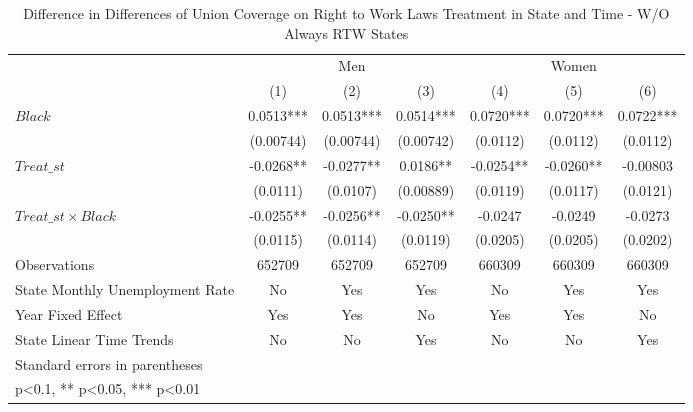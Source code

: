 \begin{table}[htbp]\centering
\def\sym#1{\ifmmode^{#1}\else\(^{#1}\)\fi}
\caption{Difference in Differences of Union Coverage on Right to Work Laws Treatment in State and Time - W/O Always RTW States}
\begin{tabular}{l*{6}{c}}
\hline\hline
                    &\multicolumn{3}{c}{Men}                        &\multicolumn{3}{c}{Women}                      \\\cmidrule(lr){2-4}\cmidrule(lr){5-7}
                    &\multicolumn{1}{c}{(1)}   &\multicolumn{1}{c}{(2)}   &\multicolumn{1}{c}{(3)}   &\multicolumn{1}{c}{(4)}   &\multicolumn{1}{c}{(5)}   &\multicolumn{1}{c}{(6)}   \\
\hline
$ Black $           &      0.0513***&      0.0513***&      0.0514***&      0.0720***&      0.0720***&      0.0722***\\
                    &   (0.00744)   &   (0.00744)   &   (0.00742)   &    (0.0112)   &    (0.0112)   &    (0.0112)   \\
[1em]
$ Treat\_{st} $      &     -0.0268** &     -0.0277** &      0.0186** &     -0.0254** &     -0.0260** &    -0.00803   \\
                    &    (0.0111)   &    (0.0107)   &   (0.00889)   &    (0.0119)   &    (0.0117)   &    (0.0121)   \\
[1em]
$ Treat\_{st} \times Black $&     -0.0255** &     -0.0256** &     -0.0250** &     -0.0247   &     -0.0249   &     -0.0273   \\
                    &    (0.0115)   &    (0.0114)   &    (0.0119)   &    (0.0205)   &    (0.0205)   &    (0.0202)   \\
\hline
Observations        &      652709   &      652709   &      652709   &      660309   &      660309   &      660309   \\
State Monthly Unemployment Rate&          No   &         Yes   &         Yes   &          No   &         Yes   &         Yes   \\
Year Fixed Effect   &         Yes   &         Yes   &          No   &         Yes   &         Yes   &          No   \\
State Linear Time Trends&          No   &          No   &         Yes   &          No   &          No   &         Yes   \\
\hline\hline
\multicolumn{7}{l}{\footnotesize Standard errors in parentheses}\\
\multicolumn{7}{l}{\footnotesize * p<0.1, ** p<0.05, *** p<0.01}\\
\end{tabular}
\end{table}
